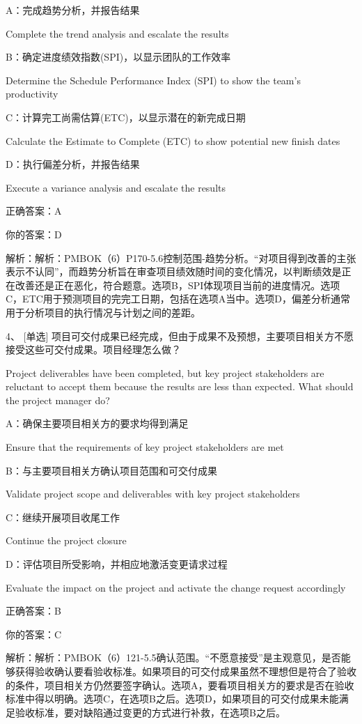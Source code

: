 A：完成趋势分析，并报告结果

Complete the trend analysis and escalate the results

B：确定进度绩效指数(SPI)，以显示团队的工作效率

Determine the Schedule Performance Index (SPI) to show the team's productivity

C：计算完工尚需估算(ETC)，以显示潜在的新完成日期

Calculate the Estimate to Complete (ETC) to show potential new finish dates

D：执行偏差分析，并报告结果

Execute a variance analysis and escalate the results

正确答案：A

你的答案：D

解析：解析：PMBOK（6）P170-5.6控制范围-趋势分析。“对项目得到改善的主张表示不认同”，而趋势分析旨在审查项目绩效随时间的变化情况，以判断绩效是正在改善还是正在恶化，符合题意。选项B，SPI体现项目当前的进度情况。选项C，ETC用于预测项目的完完工日期，包括在选项A当中。选项D，偏差分析通常用于分析项目的执行情况与计划之间的差距。



4、 [单选] 项目可交付成果已经完成，但由于成果不及预想，主要项目相关方不愿接受这些可交付成果。项目经理怎么做？

Project deliverables have been completed, but key project stakeholders are reluctant to accept them because the results are less than expected. What should the project manager do?

A：确保主要项目相关方的要求均得到满足

Ensure that the requirements of key project stakeholders are met

B：与主要项目相关方确认项目范围和可交付成果

Validate project scope and deliverables with key project stakeholders

C：继续开展项目收尾工作

Continue the project closure

D：评估项目所受影响，并相应地激活变更请求过程

Evaluate the impact on the project and activate the change request accordingly

正确答案：B

你的答案：C

解析：解析：PMBOK（6）121-5.5确认范围。“不愿意接受”是主观意见，是否能够获得验收确认要看验收标准。如果项目的可交付成果虽然不理想但是符合了验收的条件，项目相关方仍然要签字确认。选项A，要看项目相关方的要求是否在验收标准中得以明确。选项C，在选项B之后。选项D，如果项目的可交付成果未能满足验收标准，要对缺陷通过变更的方式进行补救，在选项B之后。




